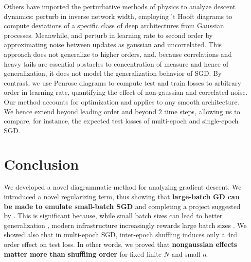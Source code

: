 \documentclass{article}
\begin{document}
    Others have imported the perturbative methods of physics to analyze descent
    dynamics:  \citet{dy19} perturb in inverse network width, employing 't
    Hooft diagrams to compute deviations of a specific class of deep
    architectures from Gaussian processes.  Meanwhile, \cite{ch18} and
    \citet{li17} perturb in learning rate to second order by approximating
    noise between updates as gaussian and uncorrelated.  This approach does not
    generalize to higher orders, and, because correlations and heavy tails are
    essential obstacles to concentration of measure and hence of
    generalization, it does not model the generalization behavior of SGD.  By
    contrast, we use Penrose diagrams to compute test and train losses to
    arbitrary order in learning rate, quantifying the effect of non-gaussian
    and correlated noise.  Our method accounts for optimization and applies to
    any smooth architecture.  We hence extend \citet{ro18} beyond leading order
    and beyond $2$ time steps, allowing us to compare, for instance, the
    expected test losses of multi-epoch and single-epoch SGD.


\section{Conclusion}


    We developed a novel diagrammatic method for analyzing gradient descent.
    We introduced a novel regularizing term, thus showing that {\bf large-batch
    GD can be made to emulate small-batch SGD} and completing a project
    suggested by \citet{ro18}.  This is significant because, while small batch
    sizes can lead to better generalization \citep{bo91}, modern infrastructure
    increasingly rewards large batch sizes \citep{go18}.  We showed also that
    in multi-epoch SGD, inter-epoch shuffling induces only a $4$rd order effect
    on test loss.  In other words, we proved that {\bf nongaussian effects
    matter more than shuffling order} for fixed finite $N$ and small $\eta$.
\end{document}
